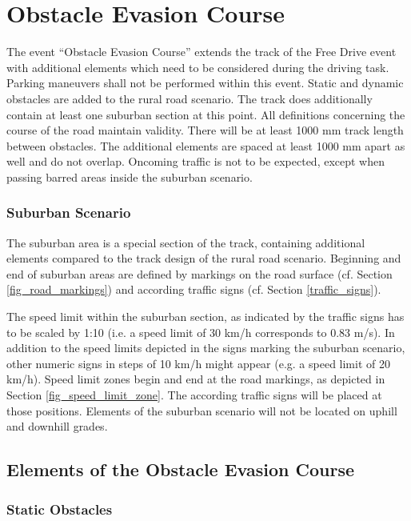 \newpage

\section{Obstacle Evasion Course}

The event “Obstacle Evasion Course” extends the track of the Free Drive event
with additional elements which need to be considered during the driving task.
Parking maneuvers shall not be performed within this event. Static and dynamic
obstacles are added to the rural road scenario. The track does additionally
contain at least one suburban section at this point. All definitions concerning
the course of the road maintain validity. There will be at least 1000 mm track
length between obstacles. The additional elements are spaced at least 1000 mm
apart as well and do not overlap. Oncoming traffic is not to be expected,
except when passing barred areas inside the suburban scenario.

\subsubsection{Suburban Scenario}

The suburban area is a special section of the track, containing additional
elements compared to the track design of the rural road scenario. Beginning and
end of suburban areas are defined by markings on the road surface (cf. Section
\ref{fig_road_markings}) and according traffic signs (cf. Section
\ref{traffic_signs}).

The speed limit within the suburban section, as indicated by the traffic signs
has to be scaled by 1:10 (i.e. a speed limit of 30 km/h corresponds to 0.83
m/s). In addition to the speed limits depicted in the signs marking the
suburban scenario, other numeric signs in steps of 10 km/h might appear (e.g. a
speed limit of 20 km/h). Speed limit zones begin and end at the road markings,
as depicted in Section \ref{fig_speed_limit_zone}. The according traffic signs
will be placed at those positions. Elements of the suburban scenario will not
be located on uphill and downhill grades.

\subsection{Elements of the Obstacle Evasion Course}
\label{elements_obstacle_evasion}
\subsubsection{Static Obstacles}

